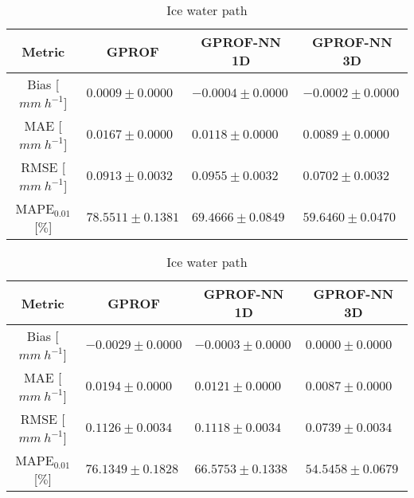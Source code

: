 \documentclass[a4paper,11pt,bibtotoc]{scrartcl}
\begin{document}
\begin{table}[hbpt!]
\begin{subtable}{\textwidth} 
 \caption{Rain water path} 
\begin{tabular}{|c||p{3.5cm}|p{3.5cm}|p{3.5cm}|}
\hline
Metric &
\multicolumn{1}{|c}{GPROF} &
\multicolumn{1}{|c}{GPROF-NN 1D} &
\multicolumn{1}{|c|}{GPROF-NN 3D} \\
\hline\hline
Bias \hfill [$\unit{mm\ h^{-1}}$] & \hfill $  0.0009 \pm 0.0000$ &\hfill $ -0.0004 \pm 0.0000$ &\hfill $ -0.0002 \pm 0.0000$ \\
MAE \hfill [$\unit{mm\ h^{-1}}$] & \hfill $  0.0167 \pm 0.0000$ &\hfill $  0.0118 \pm 0.0000$ &\hfill $  0.0089 \pm 0.0000$ \\
RMSE \hfill [$\unit{mm\ h^{-1}}$] & \hfill $  0.0913 \pm 0.0032$ &\hfill $  0.0955 \pm 0.0032$ &\hfill $  0.0702 \pm 0.0032$ \\
MAPE$_{0.01}$ \hfill [$\unit{\%}$] & \hfill $ 78.5511 \pm 0.1381$ &\hfill $ 69.4666 \pm 0.0849$ &\hfill $ 59.6460 \pm 0.0470$ \\
\hline
\end{tabular}
\end{subtable}

\begin{subtable}{\textwidth} 
 \caption{Ice water path} 
\begin{tabular}{|c||p{3.5cm}|p{3.5cm}|p{3.5cm}|}
\hline
Metric &
\multicolumn{1}{|c}{GPROF} &
\multicolumn{1}{|c}{GPROF-NN 1D} &
\multicolumn{1}{|c|}{GPROF-NN 3D} \\
\hline\hline
Bias \hfill [$\unit{mm\ h^{-1}}$] & \hfill $ -0.0029 \pm 0.0000$ &\hfill $ -0.0003 \pm 0.0000$ &\hfill $  0.0000 \pm 0.0000$ \\
MAE \hfill [$\unit{mm\ h^{-1}}$] & \hfill $  0.0194 \pm 0.0000$ &\hfill $  0.0121 \pm 0.0000$ &\hfill $  0.0087 \pm 0.0000$ \\
RMSE \hfill [$\unit{mm\ h^{-1}}$] & \hfill $  0.1126 \pm 0.0034$ &\hfill $  0.1118 \pm 0.0034$ &\hfill $  0.0739 \pm 0.0034$ \\
MAPE$_{0.01}$ \hfill [$\unit{\%}$] & \hfill $ 76.1349 \pm 0.1828$ &\hfill $ 66.5753 \pm 0.1338$ &\hfill $ 54.5458 \pm 0.0679$ \\
\hline
\end{tabular}
\end{subtable}


\end{table}
\end{document}
